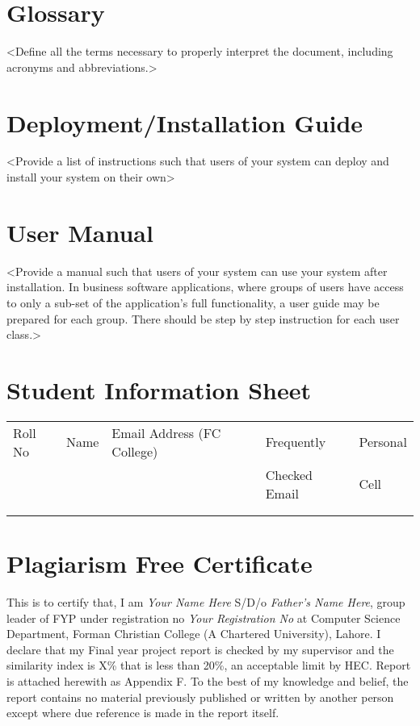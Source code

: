 \begin{appendices}

\chapter{Glossary}
<Define all the terms necessary to properly interpret the document, including acronyms and abbreviations.>

\chapter{Deployment/Installation Guide}
<Provide a list of instructions such that users of your system can deploy and install your system on their own>

\chapter{User Manual}
<Provide a manual such that users of your system can use your system after installation. In business software applications, where groups of users have access to only a sub-set of the application's full functionality, a user guide may be prepared for each group. There should be step by step instruction for each user class.>

\chapter{Student Information Sheet}
\begin{table}[htb]
\centering
\begin{tabular}{l|l|l|l|l}
Roll No & Name & Email Address (FC College) & Frequently & Personal  \\
& & & Checked Email & Cell\\\hline\hline
        &     &  & &      \\
         &      &  & &    \\
\end{tabular}
\end{table}



\chapter{Plagiarism Free Certificate}
This is to certify that, I am \textit{Your Name Here} S/D/o \textit{Father's Name Here}, group leader of FYP under registration no \textit{Your Registration No} at Computer Science Department, Forman Christian College (A Chartered University), Lahore. I declare that my Final year project report is checked by my supervisor and the similarity index is X\% that is less than 20\%, an acceptable limit by HEC. Report is attached herewith as Appendix F. To the best of my knowledge and belief, the report contains no material previously published or written by another person except where due reference is made in the report itself.


\end{appendices}

